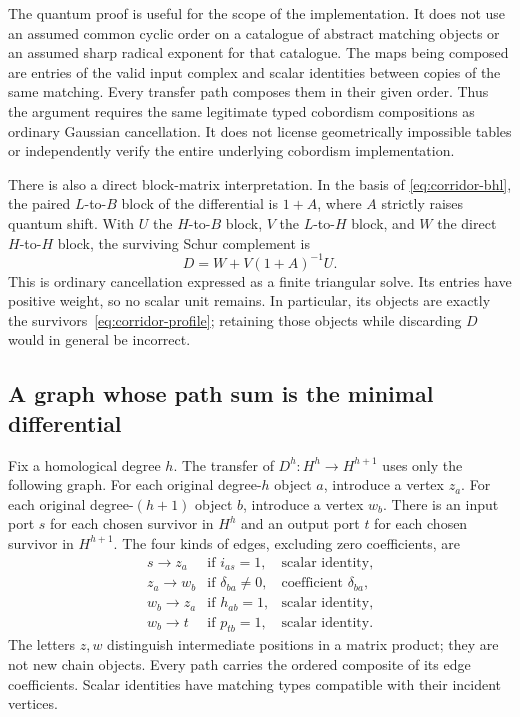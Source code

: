 The quantum proof is useful for the scope of the implementation.  It does
not use an assumed common cyclic order on a catalogue of abstract matching
objects or an assumed sharp radical exponent for that catalogue.  The maps
being composed are entries of the valid input complex and scalar identities
between copies of the same matching.  Every transfer path composes them in
their given order.  Thus the argument requires the same legitimate typed
cobordism compositions as ordinary Gaussian cancellation.  It does not
license geometrically impossible tables or independently verify the entire
underlying cobordism implementation.

There is also a direct block-matrix interpretation.  In the basis of
\eqref{eq:corridor-bhl}, the paired $L$-to-$B$ block of the differential is
$1+A$, where $A$ strictly raises quantum shift.  With $U$ the $H$-to-$B$
block, $V$ the $L$-to-$H$ block, and $W$ the direct $H$-to-$H$ block, the
surviving Schur complement is
\begin{equation}\label{eq:corridor-schur}
 D=W+V(1+A)^{-1}U.
\end{equation}
This is ordinary cancellation expressed as a finite triangular solve.  Its
entries have positive weight, so no scalar unit remains.  In particular, its
objects are exactly the survivors~\eqref{eq:corridor-profile}; retaining
those objects while discarding $D$ would in general be incorrect.

\subsection{A graph whose path sum is the minimal differential}

Fix a homological degree $h$.  The transfer of $D^h:H^h\to H^{h+1}$ uses
only the following graph.  For each original degree-$h$ object $a$, introduce
a vertex $z_a$.  For each original degree-$(h+1)$ object $b$, introduce a
vertex $w_b$.  There is an input port $s$ for each chosen survivor in $H^h$
and an output port $t$ for each chosen survivor in $H^{h+1}$.  The four kinds
of edges, excluding zero coefficients, are
\begin{equation}\label{eq:corridor-edges}
\begin{array}{ccl}
 s\longrightarrow z_a&\text{if }i_{as}=1,&\text{scalar identity},\\
 z_a\longrightarrow w_b&\text{if }\delta_{ba}\ne0,&\text{coefficient }\delta_{ba},\\
 w_b\longrightarrow z_a&\text{if }h_{ab}=1,&\text{scalar identity},\\
 w_b\longrightarrow t&\text{if }p_{tb}=1,&\text{scalar identity}.
\end{array}
\end{equation}
The letters $z,w$ distinguish intermediate positions in a matrix product;
they are not new chain objects.  Every path carries the ordered composite of
its edge coefficients.  Scalar identities have matching types compatible
with their incident vertices.

